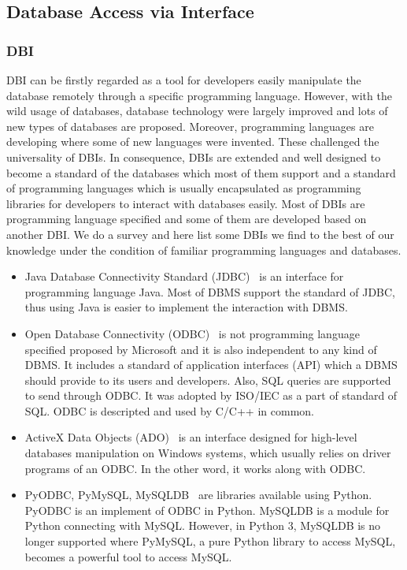 \documentclass[onecolumn, conference, 12pt]{IEEEtran}
\begin{document}
	
	
	\subsection{Database Access via Interface}
	\subsubsection{DBI}
	DBI can be firstly regarded as a tool for developers easily manipulate the database remotely through a specific programming language. However, with the wild usage of databases, database technology were largely improved and lots of new types of databases are proposed. Moreover, programming languages are developing where some of new languages were invented. These challenged the universality of DBIs. In consequence, DBIs are extended and well designed to become a standard of the databases which most of them support and a standard of programming languages which is usually encapsulated as programming libraries for developers to interact with databases easily. Most of DBIs are programming language specified and some of them are developed based on another DBI. We do a survey and here list some DBIs we find to the best of our knowledge under the condition of familiar programming languages and databases. 
	\begin{itemize}[]
		\item Java Database Connectivity Standard (JDBC)~\cite{JDBC} is an interface for programming language Java. Most of DBMS support the standard of JDBC, thus using Java is easier to implement the interaction with DBMS.
		\item Open Database Connectivity (ODBC)~\cite{ODBC} is not programming language specified proposed by Microsoft and it is also independent to any kind of DBMS. It includes a standard of application interfaces (API) which a DBMS should provide to its users and developers. Also, SQL queries are supported to send through ODBC. It was adopted by ISO/IEC as a part of standard of SQL. ODBC is descripted and used by C/C++ in common.
		\item ActiveX Data Objects (ADO)~\cite{ADO} is an interface designed for high-level databases manipulation on Windows systems, which usually relies on driver programs of an ODBC. In the other word, it works along with ODBC.
		\item PyODBC, PyMySQL, MySQLDB~\cite{pyodbc,pymysql,mysqldb} are libraries available using Python. PyODBC is an implement of ODBC in Python. MySQLDB is a module for Python connecting with MySQL. However, in Python 3, MySQLDB is no longer supported where PyMySQL, a pure Python library to access MySQL, becomes a powerful tool to access MySQL.
	\end{itemize}
\end{document}
